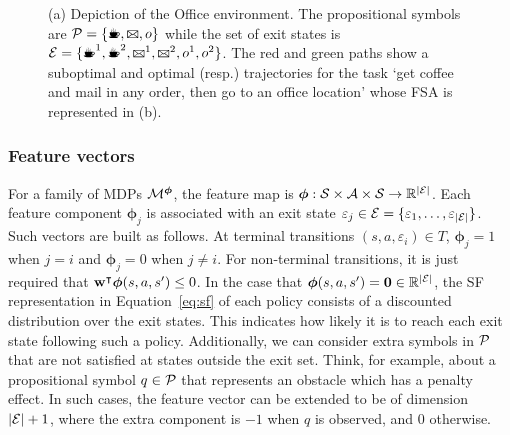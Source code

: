 \begin{figure}[!tb]
  \centering
  \begin{subfigure}[h]{0.5\textwidth}
    \centering
  
  \subcaption{}
  \label{fig:office_env}
  \end{subfigure}
  \hfill
  \centering
  \begin{subfigure}[h]{0.49\textwidth}
    \centering
  
  \subcaption{}
  \label{fig:office_fsa}
  \end{subfigure}
  \caption{(a) Depiction of the Office environment. The propositional symbols are $\cP=\{\text{\coffee}, \text{\mail}, o\}$ while the set of exit states is $\cE=\{\text{\coffee}^1,\text{\coffee}^2, \text{\mail}^1,\text{\mail}^2, o^1, o^2\}$. The red and green paths show a suboptimal and optimal (resp.) trajectories for the task `get coffee and mail in any order, then go to an office location' whose FSA is represented in (b).}
\end{figure}

\subsubsection{Feature vectors} For a family of MDPs $\mathcal{M}^{\boldsymbol{\phi}}$, the feature map is ${\boldsymbol{\phi}}:\mathcal{S}\times\mathcal{A}\times\mathcal{S}\rightarrow\mathbb{R}^{\lvert\mathcal{E}\rvert}$. Each feature component $\boldsymbol\phi_j$ is associated with an exit state $\varepsilon_j\in\mathcal{E}=\{\varepsilon_1,\ldots,\varepsilon_{\lvert\mathcal{E}\rvert}\}$. Such vectors are built as follows. At terminal transitions $(s, a, \varepsilon_i)\in T$, $\boldsymbol\phi_{j} = 1$ when $j=i$ and $\boldsymbol\phi_{j}=0$ when $j\neq i$. For non-terminal transitions, it is just required that $\mathbf{w}^\intercal\boldsymbol\phi(s, a, s')\leq 0$. In the case that ${\boldsymbol\phi(s, a, s')=\mathbf{0}\in\mathbb{R}^{\lvert\mathcal{E}\rvert}}$, the SF representation in Equation~\eqref{eq:sf} of each policy consists of a discounted distribution over the exit states. This indicates how likely it is to reach each exit state following such a policy. Additionally, we can consider extra symbols in $\mathcal{P}$ that are not satisfied at states outside the exit set. Think, for example, about a propositional symbol $q\in\mathcal{P}$ that represents an obstacle which has a penalty effect. In such cases, the feature vector can be extended to be of dimension $\lvert\mathcal{E}\rvert + 1$, where the extra component is $-1$ when $q$ is observed, and $0$ otherwise. 

